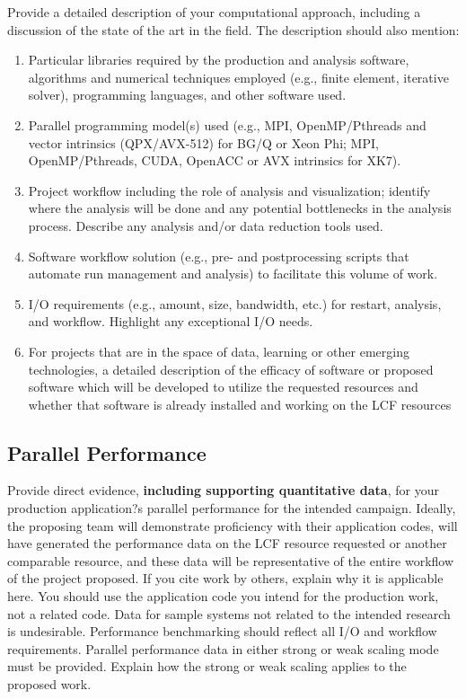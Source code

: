 \documentclass[11pt,letterpaper,english]{article}
\begin{document}
Provide a detailed description of your computational approach, including a discussion of the state of the art in the field. The description should also mention:

\vspace{-.25in}
\begin{enumerate}
\item Particular libraries required by the production and analysis software, algorithms and numerical techniques employed (e.g., finite element, iterative solver), programming languages, and other software used.
\item Parallel programming model(s) used (e.g., MPI, OpenMP/Pthreads and vector intrinsics (QPX/AVX-512) for BG/Q or Xeon Phi; MPI, OpenMP/Pthreads, CUDA, OpenACC or AVX intrinsics for XK7).
\item Project workflow including the role of analysis and visualization; identify where the analysis will be done and any potential bottlenecks in the analysis process.  Describe any analysis and/or data reduction tools used.
\item Software workflow solution (e.g., pre- and postprocessing scripts that automate run management and analysis) to facilitate this volume of work.
\item I/O requirements (e.g., amount, size, bandwidth, etc.) for restart, analysis, and workflow. Highlight any exceptional I/O needs.
\item For projects that are in the space of data, learning or other emerging technologies, a detailed description of the efficacy of software or proposed software which will be developed to utilize the requested resources and whether that software is already installed and working on the LCF resources
\end{enumerate}

\vspace{-.25in}
\subsection{Parallel Performance}
\vspace{-.2in}

Provide direct evidence, {\bf including supporting quantitative data}, for your production application?s parallel performance for the intended campaign. Ideally, the proposing team will demonstrate proficiency with their application codes, will have generated the performance data on the LCF resource requested or another comparable resource, and these data will be representative of the entire workflow of the project proposed. If you cite work by others, explain why it is applicable here. You should use the application code you intend for the production work, not a related code. Data for sample systems not related to the intended research is undesirable. Performance benchmarking should reflect all I/O and workflow requirements. Parallel performance data in either strong or weak scaling mode must be provided. Explain how the strong or weak scaling applies to the proposed work. 
\end{document}
